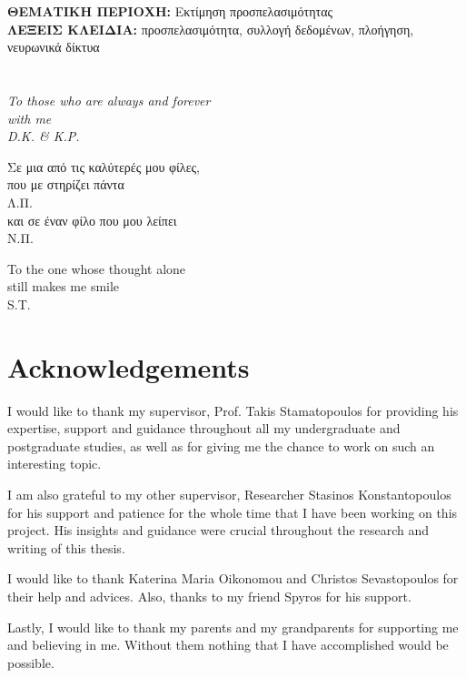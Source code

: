 \documentclass[12pt,a4paper,table,dvipsnames,tikz]{report}
\begin{document}
	\vfill
	\noindent
	\MakeUppercase{\textbf{Θεματικη Περιοχη: }} Εκτίμηση προσπελασιμότητας
	\\
	\MakeUppercase{\textbf{Λεξεις Κλειδια: }} προσπελασιμότητα, συλλογή δεδομένων, 
	πλοήγηση, νευρωνικά δίκτυα
	
	
	\chapter*{}
	\thispagestyle{empty}
	\begin{flushright}
	\itshape
	To those who are always and forever\\
	with me\\
	D.K. \& K.P.\\
	\vspace{4cm}
	
	Σε μια από τις καλύτερές μου φίλες,\\
	που με στηρίζει πάντα\\
	Λ.Π.\\
	\vspace{0.5cm}
	και σε έναν φίλο που μου λείπει\\
	Ν.Π.\\
	\vspace{4cm}
	
	To the one whose thought alone\\
	still makes me smile\\
	S.T.
	\end{flushright}
	
	\chapter*{Acknowledgements}
	\thispagestyle{empty}
	I would like to thank my supervisor, Prof. Takis Stamatopoulos for providing his 
	expertise, support and guidance throughout all my undergraduate and postgraduate 
	studies, as well as for giving me the chance to work on such an interesting topic.
	\par
	I am also grateful to my other supervisor, Researcher Stasinos Konstantopoulos 
	for his support and patience for the whole time that I have been working 
	on this project. His insights and guidance were crucial throughout the research 
	and writing of this thesis.
	\par
	I would like to thank Katerina Maria Oikonomou and Christos Sevastopoulos for 
	their help and advices. Also, thanks to my friend Spyros for his support. 
	\par
	Lastly, I would like to thank my parents and my grandparents for supporting me and 
	believing in me. Without them nothing that I have accomplished would be possible.
	
\end{document}

